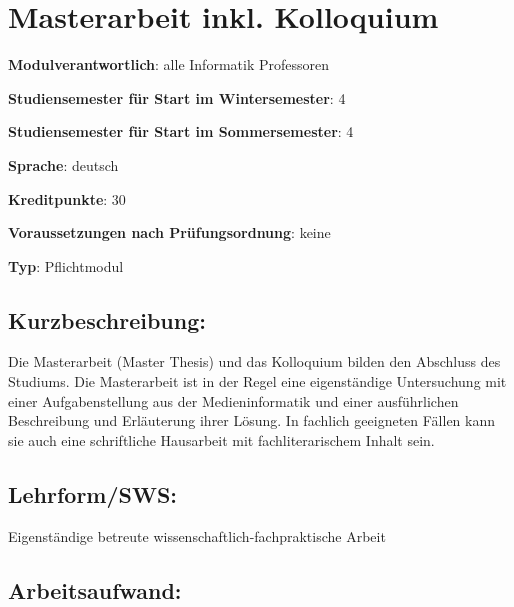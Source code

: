 \chapter{Masterarbeit inkl.
Kolloquium}\label{masterarbeit-inkl.-kolloquium}

\begin{modulHead}
\textbf{Modulverantwortlich}: alle Informatik
Professoren
\end{modulHead}
\begin{modulHead}
\textbf{Studiensemester
für Start im Wintersemester}:
4
\end{modulHead}
\begin{modulHead}
\textbf{Studiensemester für Start
im Sommersemester}:
4
\end{modulHead}
\begin{modulHead}
\textbf{Sprache}:
deutsch
\end{modulHead}
\begin{modulHead}
\textbf{Kreditpunkte}:
30
\end{modulHead}
\begin{modulHead}
\textbf{Voraussetzungen nach
Prüfungsordnung}: keine
\end{modulHead}
\begin{modulHead}
\textbf{Typ}:
Pflichtmodul
\end{modulHead}


\section*{Kurzbeschreibung:}\label{kurzbeschreibung}

Die Masterarbeit (Master Thesis) und das Kolloquium bilden den Abschluss
des Studiums. Die Masterarbeit ist in der Regel eine eigenständige
Untersuchung mit einer Aufgabenstellung aus der Medieninformatik und
einer ausführlichen Beschreibung und Erläuterung ihrer Lösung. In
fachlich geeigneten Fällen kann sie auch eine schriftliche Hausarbeit
mit fachliterarischem Inhalt sein.

\section*{Lehrform/SWS:}\label{lehrformsws-1}

Eigenständige betreute wissenschaftlich-fachpraktische Arbeit

\section*{Arbeitsaufwand:}\label{arbeitsaufwand-1}

